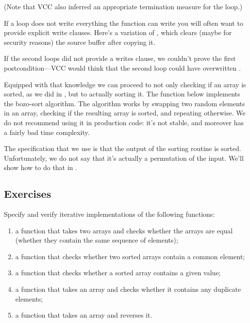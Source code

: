 (Note that VCC also inferred an appropriate
termination measure for the  loop.)

If a loop does not write everything the function can write
you will often want to provide explicit write clauses.
Here's a variation of , which clears (maybe for security reasons)
the source buffer after copying it.


\noindent
If the second loops did not provide a writes clause,
we couldn't prove the first postcondition---VCC 
would think that the second loop could have overwritten .

Equipped with that knowledge we can proceed to not only checking
if an array is sorted, as we did in , but to actually
sorting it.
The function below implements the bozo-sort algorithm.
The algorithm works by swapping two random elements in an array, checking if the resulting array
is sorted, and repeating otherwise.
We do not recommend using it in production code:
it's not stable, and moreover has a fairly bad time complexity.


The specification that we use is that the output of the sorting routine is sorted.
Unfortunately, we do not say that it's actually a permutation of the input.
We'll show how to do that in .


\subsection*{Exercises}
Specify and verify iterative implementations of the following functions:
\begin{enumerate}
\item
a function that takes two arrays and checks whether
the arrays are equal (\ie whether they contain the same sequence of
elements); 
\item
a function that checks whether two sorted arrays
contain a common element;
\item
a function that checks whether a sorted array contains a given value;
\item
a function that takes an array and checks whether it
contains any duplicate elements;
\item
a function that takes an array and reverses it.
\end{enumerate}

